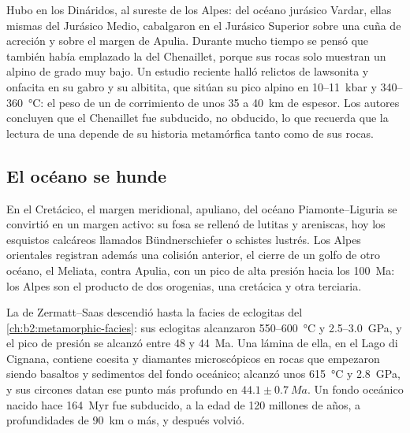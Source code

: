 Hubo  en los Dináridos, al sureste de los Alpes:  del océano jurásico
Vardar, ellas mismas del Jurásico Medio, cabalgaron en el Jurásico Superior sobre una
cuña de acreción y sobre el margen de Apulia. Durante mucho tiempo se pensó que también había emplazado la
 del Chenaillet, porque sus rocas solo muestran un  alpino de grado muy
bajo. Un estudio reciente halló relictos de lawsonita y onfacita en su gabro y su
albitita, que sitúan su pico alpino en 10--\qty{11}{kbar} y 340--\qty{360}{\celsius}:
el peso de un  de corrimiento de unos 35 a \qty{40}{km} de espesor. Los autores
concluyen que el Chenaillet fue subducido, no obducido, lo que recuerda que la lectura de
una  depende de su historia metamórfica tanto como de sus rocas.

\subsection*{El océano se hunde}

En el Cretácico, el margen meridional, apuliano, del océano Piamonte--Liguria se convirtió en un
margen activo: su fosa se rellenó de lutitas y areniscas, hoy los esquistos calcáreos
llamados Bündnerschiefer o schistes lustrés. Los Alpes orientales registran además una colisión
anterior, el cierre de un golfo de otro océano, el Meliata, contra Apulia, con un
pico de alta presión hacia los \qty{100}{Ma}: los Alpes son el producto de dos orogenias, una
cretácica y otra terciaria.

La  de Zermatt--Saas descendió hasta la facies de eclogitas del
\cref{ch:b2:metamorphic-facies}: sus eclogitas alcanzaron 550--\qty{600}{\celsius} y
2.5--\qty{3.0}{GPa}, y el pico de presión se alcanzó entre 48 y \qty{44}{Ma}. Una lámina de ella,
en el Lago di Cignana, contiene coesita y diamantes microscópicos en rocas que empezaron siendo basaltos
y sedimentos del fondo oceánico; alcanzó unos \qty{615}{\celsius} y \qty{2.8}{GPa}, y sus
circones datan ese punto más profundo en $44.1 \pm \qty{0.7}{Ma}$. Un fondo oceánico nacido
hace \qty{164}{Myr} fue subducido, a la edad de 120 millones de años, a profundidades de
\qty{90}{km} o más, y después volvió.

